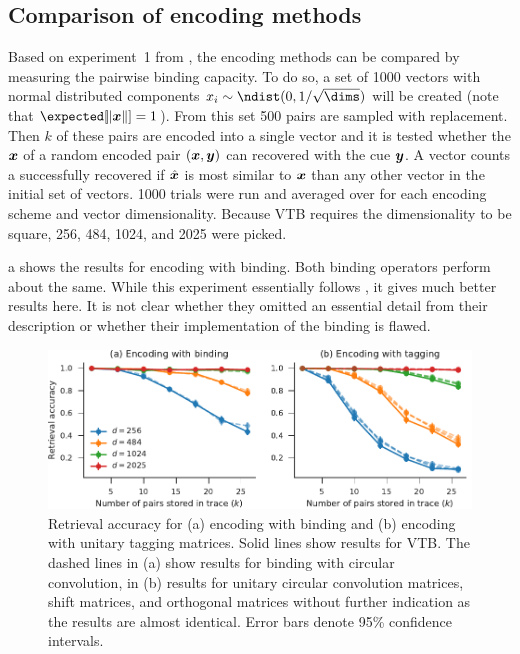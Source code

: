 \subsection{Comparison of encoding methods}
Based on experiment~1 from \textcite{recchia2015}, the encoding methods can be compared by measuring the pairwise binding capacity.
To do so, a set of \num{1000} vectors with normal distributed components $x_i \sim \ndist(0, 1/\sqrt{\dims})$ will be created (note that $\expected[\norm{\vc x}] = 1$).
From this set \num{500} pairs are sampled with replacement.
Then $k$ of these pairs are encoded into a single vector and it is tested whether the $\bm{x}$ of a random encoded pair $(\bm{x}, \bm{y})$ can recovered with the cue $\bm{y}$.
A vector counts a successfully recovered if $\hat{\bm{x}}$ is most similar to $\bm{x}$ than any other vector in the initial set of vectors.
\num{1000} trials were run and averaged over for each encoding scheme and vector dimensionality.
Because VTB requires the dimensionality to be square, \num{256}, \num{484}, \num{1024}, and \num{2025} were picked.

a shows the results for encoding with binding.
Both binding operators perform about the same.
While this experiment essentially follows \textcite{recchia2015}, it gives much better results here.
It is not clear whether they omitted an essential detail from their description or whether their implementation of the binding is flawed.
\begin{figure}
    \centering
    \includegraphics{figures/encoding}
    \caption{Retrieval accuracy for (a) encoding with binding and (b) encoding with unitary tagging matrices. Solid lines show results for VTB\@. The dashed lines in (a) show results for binding with circular convolution, in (b) results for unitary circular convolution matrices, shift matrices, and orthogonal matrices without further indication as the results are almost identical. Error bars denote 95\% confidence intervals.}\label{fig:encoding}
\end{figure}

